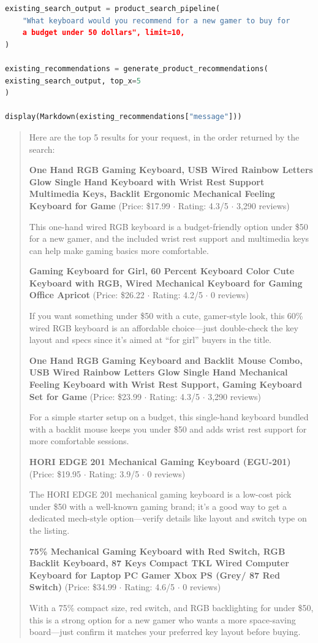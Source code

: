 \documentclass{article}
\begin{document}
\begin{lstlisting}[language=Python]
existing_search_output = product_search_pipeline(
    "What keyboard would you recommend for a new gamer to buy for 
    a budget under 50 dollars", limit=10,
)

existing_recommendations = generate_product_recommendations(
existing_search_output, top_x=5
)

display(Markdown(existing_recommendations["message"]))
\end{lstlisting}

\begin{quote}
Here are the top 5 results for your request, in the order returned by the search:

\textbf{One Hand RGB Gaming Keyboard, USB Wired Rainbow Letters Glow Single Hand Keyboard with Wrist Rest Support Multimedia Keys, Backlit Ergonomic Mechanical Feeling Keyboard for Game} (Price: \$17.99 $\cdot$ Rating: 4.3/5 $\cdot$ 3,290 reviews)

This one-hand wired RGB keyboard is a budget-friendly option under \$50 for a new gamer, and the included wrist rest support and multimedia keys can help make gaming basics more comfortable.

\textbf{Gaming Keyboard for Girl, 60 Percent Keyboard Color Cute Keyboard with RGB, Wired Mechanical Keyboard for Gaming Office Apricot} (Price: \$26.22 $\cdot$ Rating: 4.2/5 $\cdot$ 0 reviews)

If you want something under \$50 with a cute, gamer-style look, this 60\% wired RGB keyboard is an affordable choice---just double-check the key layout and specs since it’s aimed at ``for girl'' buyers in the title.

\textbf{One Hand RGB Gaming Keyboard and Backlit Mouse Combo, USB Wired Rainbow Letters Glow Single Hand Mechanical Feeling Keyboard with Wrist Rest Support, Gaming Keyboard Set for Game} (Price: \$23.99 $\cdot$ Rating: 4.3/5 $\cdot$ 3,290 reviews)

For a simple starter setup on a budget, this single-hand keyboard bundled with a backlit mouse keeps you under \$50 and adds wrist rest support for more comfortable sessions.

\textbf{HORI EDGE 201 Mechanical Gaming Keyboard (EGU-201)} (Price: \$19.95 $\cdot$ Rating: 3.9/5 $\cdot$ 0 reviews)

The HORI EDGE 201 mechanical gaming keyboard is a low-cost pick under \$50 with a well-known gaming brand; it’s a good way to get a dedicated mech-style option---verify details like layout and switch type on the listing.

\textbf{75\% Mechanical Gaming Keyboard with Red Switch, RGB Backlit Keyboard, 87 Keys Compact TKL Wired Computer Keyboard for Laptop PC Gamer Xbox PS (Grey/ 87 Red Switch)} (Price: \$34.99 $\cdot$ Rating: 4.6/5 $\cdot$ 0 reviews)

With a 75\% compact size, red switch, and RGB backlighting for under \$50, this is a strong option for a new gamer who wants a more space-saving board---just confirm it matches your preferred key layout before buying.
\end{quote}
\end{document}
